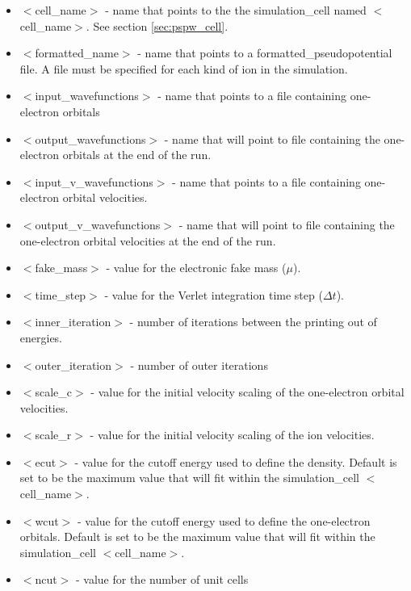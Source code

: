 \begin{itemize}
	\item $<$cell\_name$>$ - name that points to the
              the simulation\_cell named $<$cell\_name$>$.  See section \ref{sec:pspw_cell}.
	\item $<$formatted\_name$>$ - name that points
              to a formatted\_pseudopotential file.  A file must
              be specified for each kind of ion in the simulation.
	\item $<$input\_wavefunctions$>$ - name that points
              to a file containing one-electron orbitals
	\item $<$output\_wavefunctions$>$ - name that will
              point to file containing the one-electron orbitals at the
              end of the run. 
	\item $<$input\_v\_wavefunctions$>$ - name that points
              to a file containing one-electron orbital velocities.
	\item $<$output\_v\_wavefunctions$>$ - name that will
              point to file containing the one-electron orbital velocities
	      at the end of the run. 
	\item $<$fake\_mass$>$ - value for the electronic
              fake mass ($\mu$).
	\item $<$time\_step$>$ - value for the Verlet integration 
               time step ($\Delta t$).
	\item $<$inner\_iteration$>$ - number of iterations between the
              printing out of energies.
	\item $<$outer\_iteration$>$ - number of outer iterations
 	\item $<$scale\_c$>$ - value for the initial velocity
			      scaling of the one-electron orbital velocities.
	\item $<$scale\_r$>$ - value for the initial velocity
			      scaling of the ion velocities.
	\item $<$ecut$>$ - value for the cutoff energy used
                           to define the density.  Default is set
                           to be the maximum value that will fit
                           within the simulation\_cell $<$cell\_name$>$.
	\item $<$wcut$>$ - value for the cutoff energy used
 			   to define the one-electron orbitals.  Default is set
                           to be the maximum value that will fit
                           within the simulation\_cell $<$cell\_name$>$.
	\item $<$ncut$>$ - value for the number of unit cells

\end{itemize}
